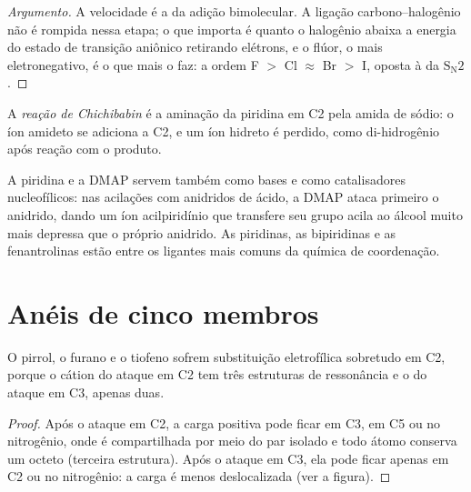 \begin{proof}[Argumento]
A velocidade é a da adição bimolecular. A ligação carbono--halogênio não é
rompida nessa etapa; o que importa é quanto o halogênio abaixa a energia do
estado de transição aniônico retirando elétrons, e o flúor, o mais
eletronegativo, é o que mais o faz: a ordem F $>$ Cl $\approx$ Br $>$ I, oposta à da $\mathrm S_\mathrm N2$.
\end{proof}

\begin{definition}\label{def:b3:heterocycles:chichibabin}
A \emph{reação de Chichibabin} é a aminação da
piridina em C2 pela amida de sódio: o íon amideto se adiciona a C2, e um íon hidreto é
perdido, como di-hidrogênio após reação com o produto.
\end{definition}

A piridina e a DMAP servem também como bases e como catalisadores nucleofílicos: nas
acilações com anidridos de ácido, a DMAP ataca primeiro o anidrido, dando um
íon acilpiridínio que transfere seu grupo acila ao álcool muito mais depressa que
o próprio anidrido. As piridinas, as bipiridinas e as fenantrolinas estão entre os
ligantes mais comuns da química de coordenação.

\section{Anéis de cinco membros}

\begin{proposition}\label{prop:b3:heterocycles:pyrrole-c2}
O pirrol, o furano e o tiofeno sofrem substituição eletrofílica sobretudo em C2,
porque o cátion do ataque em C2 tem três estruturas de ressonância e o
do ataque em C3, apenas duas.
\end{proposition}

\begin{proof}
Após o ataque em C2, a carga positiva pode ficar em C3, em C5 ou no nitrogênio,
onde é compartilhada por meio do par isolado e todo átomo conserva um octeto (terceira
estrutura). Após o ataque em C3, ela pode ficar apenas em C2 ou no nitrogênio: a carga
é menos deslocalizada (ver a figura).
\end{proof}

